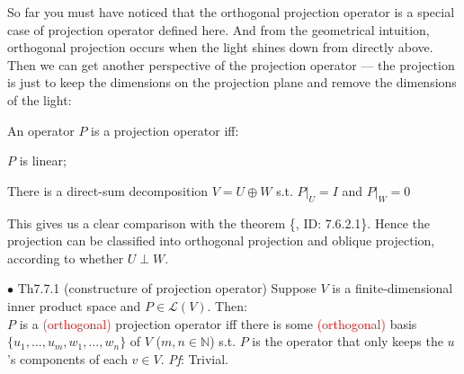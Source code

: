 \documentclass{article}
\begin{document}
\begin{Rmk}{}
    So far you must have noticed that \textcolor{Th}{the orthogonal projection operator is a special case of projection operator defined here.} And from the geometrical intuition, orthogonal projection occurs when the light shines down from directly above. Then we can get another perspective of the projection operator — the projection is just to keep the dimensions on the projection plane and remove the dimensions of the light:
    \textcolor{Th}{An operator $P$ is a projection operator iff:
    \begin{compactenum}
        \item $P$ is linear;
        \item There is a direct-sum decomposition $V = U\oplus W$ s.t. $P|_U = I$ and $P|_W = 0$
    \end{compactenum}    
    }
    This gives us a clear comparison with the theorem \{, ID: 7.6.2.1\}. Hence \textcolor{Df}{the projection can be classified into orthogonal projection and oblique projection, according to whether $U\perp W$.}
\end{Rmk}

\begin{Th}{$\bullet$ Th7.7.1 (constructure of projection operator)}
    Suppose $V$ is a finite-dimensional inner product space and $P\in\mathcal{L}(V)$. Then:\\
    $P$ is a \textcolor{red}{(orthogonal)} projection operator iff there is some \textcolor{red}{(orthogonal)} basis $\{u_1, \dots, u_m, w_1, \dots, w_n\}$ of $V$ ($m, n\in\mathbb{N}$) s.t. $P$ is the operator that only keeps the $u$'s components of each $v\in V$. 
    \tcblower
    \textit{Pf}: Trivial.
\end{Th}
\end{document}
